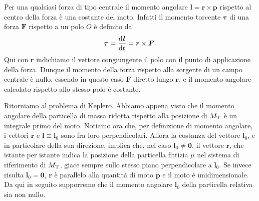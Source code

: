Per una qualsiasi forza di tipo centrale il momento angolare $\bm{l} = \bm{r}
\times \bm{p}$ rispetto al centro della forza è una costante del moto. Infatti
il momento torcente $\bm{\tau}$ di una forza $\bm{F}$ rispetto a un polo $O$ è
definito da
\begin{equation}
  \bm{\tau}= \frac{{\mathop{}\!\mathrm{d}^{}}\bm{l}}{\mathop{}\!\mathrm{d} {t}^{}} = \bm{r}\times\bm{F}.
\end{equation}
Qui con $\bm{r}$ indichiamo il vettore congiungente il polo con il punto di
applicazione della forza. Dunque il momento della forza rispetto alla sorgente
di un campo centrale è nullo, essendo in questo caso $\bm{F}$ diretto lungo
$\bm{r}$, e il momento angolare calcolato rispetto allo stesso polo è costante.

Ritorniamo al problema di Keplero. Abbiamo appena visto che il momento angolare
della particella di massa ridotta rispetto alla posizione di $M_\textup{T}$ è un
integrale primo del moto. Notiamo ora che, per definizione di momento angolare,
i vettori $\bm{r}$ e $\bm{l}\equiv\bm{l}_0$ sono fra loro perpendicolari. Allora
la costanza del vettore $\bm{l}_0$, e in particolare della sua direzione,
implica che, nel caso $\bm{l}_0\neq\bm{0}$, il vettore $\bm{r}$, che istante per
istante indica la posizione della particella fittizia $\mu$ nel sistema di
riferimento di $M_\textup{T}$, giace sempre sullo stesso piano perpendicolare a
$\bm{l}_0$. Se invece risulta $\bm{l}_0=\bm{0}$, $\bm{r}$ è parallelo alla
quantità di moto $\bm{p}$ e il moto è unidimensionale. Da qui in seguito
supporremo che il momento angolare $\bm{l}_0$ della particella relativa sia non
nullo.

